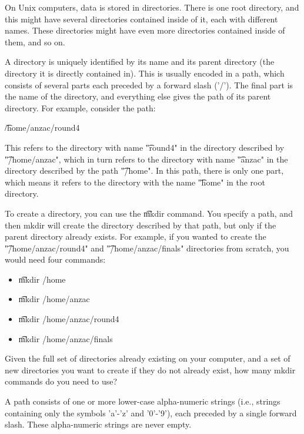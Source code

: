 On Unix computers, data is stored in directories. There is one root directory, and this might
have several directories contained inside of it, each with different names. These directories
might have even more directories contained inside of them, and so on.

A directory is uniquely identified by its name and its parent directory (the directory it is
directly contained in). This is usually encoded in a path, which consists of several parts each
preceded by a forward slash ('/'). The final part is the name of the directory, and everything
else gives the path of its parent directory. For example, consider the path:

\t{/home/anzac/round4}

This refers to the directory with name \t{"round4"} in the directory described by \t{"/home/anzac"},
which in turn refers to the directory with name \t{"anzac"} in the directory described by the path
\t{"/home"}. In this path, there is only one part, which means it refers to the directory with the
name \t{"home"} in the root directory.

To create a directory, you can use the \t{mkdir} command. You specify a path, and then mkdir will
create the directory described by that path, but only if the parent directory already exists.
For example, if you wanted to create the \t{"/home/anzac/round4"} and \t{"/home/anzac/finals"} directories
from scratch, you would need four commands:

\begin{itemize}
  \item \t{mkdir /home}
  \item \t{mkdir /home/anzac}
  \item \t{mkdir /home/anzac/round4}
  \item \t{mkdir /home/anzac/finals}
\end{itemize}

Given the full set of directories already existing on your computer, and a set of new
directories you want to create if they do not already exist, how many mkdir commands do you
need to use?

A path consists of one or more lower-case alpha-numeric strings (i.e., strings containing only
the symbols 'a'-'z' and '0'-'9'), each preceded by a single forward slash. These alpha-numeric
strings are never empty.
